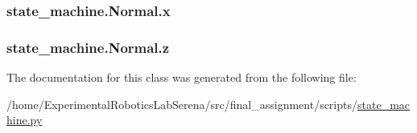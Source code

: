 \subsubsection[{\texorpdfstring{x}{x}}]{\setlength{\rightskip}{0pt plus 5cm}state\+\_\+machine.\+Normal.\+x\hspace{0.3cm}{\ttfamily [static]}}\hypertarget{classstate__machine_1_1Normal_a474c7681d4377c15bf89a5062887bd49}{}\label{classstate__machine_1_1Normal_a474c7681d4377c15bf89a5062887bd49}
\subsubsection[{\texorpdfstring{z}{z}}]{\setlength{\rightskip}{0pt plus 5cm}state\+\_\+machine.\+Normal.\+z\hspace{0.3cm}{\ttfamily [static]}}\hypertarget{classstate__machine_1_1Normal_a6261e388441dd73175646b4eb06453f7}{}\label{classstate__machine_1_1Normal_a6261e388441dd73175646b4eb06453f7}


The documentation for this class was generated from the following file\+:\begin{DoxyCompactItemize}
\item 
/home/\+Experimental\+Robotics\+Lab\+Serena/src/final\+\_\+assignment/scripts/\hyperlink{state__machine_8py}{state\+\_\+machine.\+py}\end{DoxyCompactItemize}

